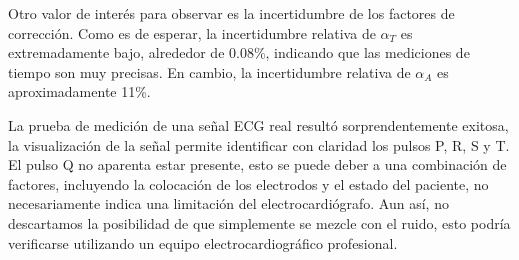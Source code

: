 \documentclass[conference]{IEEEtran}
\begin{document}
Otro valor de interés para observar es la incertidumbre de los factores de corrección.
Como es de esperar, la incertidumbre relativa de $\alpha_T$ es extremadamente bajo,
alrededor de 0.08\%, indicando que las mediciones de tiempo son muy precisas.
En cambio, la incertidumbre relativa de $\alpha_A$ es aproximadamente 11\%.

La prueba de medición de una señal ECG real resultó sorprendentemente exitosa,
la visualización de la señal permite identificar con claridad los pulsos P, R, S y T.
El pulso Q no aparenta estar presente, esto se puede deber a una combinación de
factores, incluyendo la colocación de los electrodos y el estado del paciente,
no necesariamente indica una limitación del electrocardiógrafo. Aun así, no
descartamos la posibilidad de que simplemente se mezcle con el ruido, esto podría
verificarse utilizando un equipo electrocardiográfico profesional.




\newpage

\end{document}
